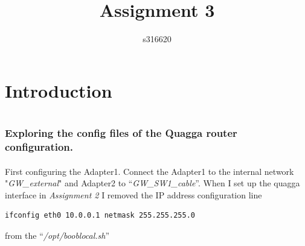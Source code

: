 \documentclass[12pt,a4paper,final]{IEEtran}
\title{Assignment 3\\}
\author{s316620\\}
\begin{document}
\maketitle
\newpage


\part*{Introduction}


\part*{}

\section{}

\section{Exploring the config files of the Quagga router configuration.}

\subsection{}
First configuring the Adapter1. Connect the Adapter1 to the internal network "\textit{GW\_external}"  and Adapter2 to ``\textit{GW\_SW1\_cable}''. 
When I set up the quagga interface in \textit{Assignment 2 } I removed the IP address configuration line 
\begin{verbatim}
ifconfig eth0 10.0.0.1 netmask 255.255.255.0
\end{verbatim}
from the ``\textit{/opt/booblocal.sh}''
\end{document}
